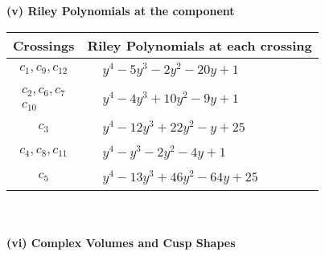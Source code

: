 \documentclass[1p]{elsarticle_modified}
\theoremstyle{definition}
\begin{document}
\newpage\renewcommand{\arraystretch}{1}
\flushleft \textbf{(v) Riley Polynomials at the component}\newline \\
\begin{tabular}{m{50pt}|m{274pt}}
Crossings & \hspace{64pt}Riley Polynomials at each crossing \\
\hline $$\begin{aligned}c_{1},c_{9},c_{12}\end{aligned}$$&$\begin{aligned}
&y^4-5 y^3-2 y^2-20 y+1
\end{aligned}$\\
\hline $$\begin{aligned}c_{2},c_{6},c_{7}\\c_{10}\end{aligned}$$&$\begin{aligned}
&y^4-4 y^3+10 y^2-9 y+1
\end{aligned}$\\
\hline $$\begin{aligned}c_{3}\end{aligned}$$&$\begin{aligned}
&y^4-12 y^3+22 y^2- y+25
\end{aligned}$\\
\hline $$\begin{aligned}c_{4},c_{8},c_{11}\end{aligned}$$&$\begin{aligned}
&y^4- y^3-2 y^2-4 y+1
\end{aligned}$\\
\hline $$\begin{aligned}c_{5}\end{aligned}$$&$\begin{aligned}
&y^4-13 y^3+46 y^2-64 y+25
\end{aligned}$\\
\hline
\end{tabular}\\~\\
\newpage\flushleft \textbf{(vi) Complex Volumes and Cusp Shapes}
\end{document}
